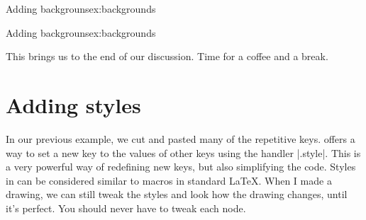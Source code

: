 \begin{texexample}{Adding backgrouns}{ex:backgrounds}
\end{texexample}


\begin{texexample}{Adding backgrouns}{ex:backgrounds}
\end{texexample}

This brings us to the end of our discussion. Time for a coffee and a break.                

\section{Adding styles}

In our previous example, we cut and pasted many of the repetitive keys. \pgfname offers a way to set a new key to the values of other keys using the handler |.style|. This is a very powerful way of redefining new keys, but also simplifying the code. Styles in \tikzname can be considered similar to macros in standard LaTeX. When I made a drawing, we can still tweak the styles and look how the drawing changes, until it's perfect. You should never have to tweak each node.

